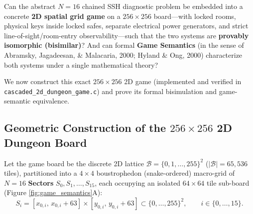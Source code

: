 \documentclass[11pt,a4paper]{article}
\theoremstyle{definition}
\theoremstyle{remark}
\begin{document}
Can the abstract $N=16$ chained SSH diagnostic problem be embedded into a concrete \textbf{2D spatial grid game} on a $256 \times 256$ board---with locked rooms, physical keys inside locked safes, separate electrical power generators, and strict line-of-sight/room-entry observability---such that the two systems are \textbf{provably isomorphic (bisimilar)}? And can formal \textbf{Game Semantics} (in the sense of Abramsky, Jagadeesan, \& Malacaria, 2000; Hyland \& Ong, 2000) characterize both systems under a single mathematical theory?

We now construct this exact $256 \times 256$ 2D game (implemented and verified in \texttt{cascaded\_2d\_dungeon\_game.c}) and prove its formal bisimulation and game-semantic equivalence.

\subsection{Geometric Construction of the $256 \times 256$ 2D Dungeon Board}

Let the game board be the discrete 2D lattice $\mathcal{B} = \{0, 1, \dots, 255\}^2$ ($|\mathcal{B}| = 65,536$ tiles), partitioned into a $4 \times 4$ boustrophedon (snake-ordered) macro-grid of $N = 16$ \textbf{Sectors} $S_0, S_1, \dots, S_{15}$, each occupying an isolated $64 \times 64$ tile sub-board (Figure \ref{fig:game_semantics}A):
\begin{equation}
    S_i = [x_{0,i}, \, x_{0,i} + 63] \times [y_{0,i}, \, y_{0,i} + 63] \subset \{0, \dots, 255\}^2, \qquad i \in \{0, \dots, 15\}.
\end{equation}
\end{document}
